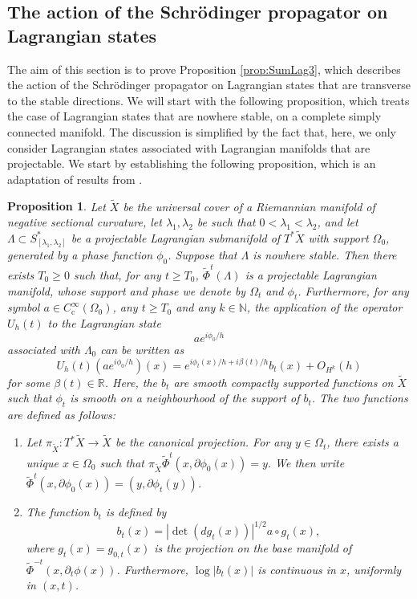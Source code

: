 \documentclass[10pt]{amsart}
\newcommand{\rc}{\mathrm{c}}
\theoremstyle{plain}
\newtheorem{proposition}[theorem]{Proposition}
\theoremstyle{definition}
\newcommand{\N}{\mathbb{N}}
\newcommand{\R}{\mathbb{R}}
\begin{document}
\subsection{The action of the Schrödinger propagator on Lagrangian states}\label{ss:demo_propagation}
The aim of this section is to prove Proposition \ref{prop:SumLag3}, which describes the action of the Schrödinger propagator on Lagrangian states that are transverse to the stable directions. We will start with the following proposition, which treats the case of Lagrangian states that are nowhere stable, on a complete simply connected manifold. The discussion is simplified by the fact that, here, we only consider Lagrangian states associated with Lagrangian manifolds that are projectable. We start by establishing the following proposition, which is an adaptation of results from \cite[\S 4.1]{NZ}.
\begin{proposition}\label{cor:SchrodHadam}
Let $\widetilde{X}$ be the universal cover of a Riemannian manifold of negative sectional curvature, let $\lambda_1,\lambda_2$ be such that $0<\lambda_1<\lambda_2$, and
let $\Lambda \subset S^*_{[\lambda_1,\lambda_2]}$ be a projectable Lagrangian submanifold of $T^*\widetilde{X}$ with support $\Omega_0$, generated by a phase function $\phi_0$. Suppose that $\Lambda$ is nowhere stable. Then there exists $T_0\geq 0$ such that, for any $t\geq T_0$, $\widetilde{\Phi}^t(\Lambda)$ is a projectable Lagrangian manifold, whose support and phase we denote by $\Omega_t$ and $\phi_t$. Furthermore, for any symbol $a\in C_\rc^\infty(\Omega_0)$, any $t\geq T_0$ and any $k\in \N$, the application of the operator $U_h(t)$ to the Lagrangian state
\begin{equation*}
a e^{i\phi_0/h}
\end{equation*}
associated with $\Lambda_0$ can be written as
\begin{equation*}
U_h(t) (a e^{i\phi_0/h})(x) = e^{i\phi_{t}(x)/h+i\beta(t)/h} b_{t}(x) +O_{H^k}(h)
\end{equation*}
for some $\beta(t)\in \R$. Here, the $b_{t}$ are smooth compactly supported functions on $\widetilde{X}$ such that $\phi_{t}$ is smooth on a neighbourhood of the support of $b_{t}$. The two functions are defined as follows:
\begin{enumerate}
\item Let $\pi_{\widetilde{X}}:T^*\widetilde{X}\to\widetilde{X}$ be the canonical projection. For any $y\in \Omega_t$, there exists a unique $x\in \Omega_0$ such that $\pi_{\widetilde{X}}\widetilde{\Phi}^t(x, \partial \phi_0(x)) =y$. We then write $\widetilde{\Phi}^t(x, \partial \phi_0(x)) = (y, \partial \phi_t(y))$.
\item The function $b_t$ is defined by
\[
b_t(x)=|{\det}(dg_t(x))|^{1/2}a\circ g_t(x),
\]
where $g_t(x)= g_{0,t}(x)$ is the projection on the base manifold of $\widetilde{\Phi}^{-t}(x,\partial_t\phi(x))$. Furthermore, $\log|b_t(x)|$ is continuous in $x$, uniformly in $(x,t)$.
\end{enumerate}
\end{proposition}
\end{document}
